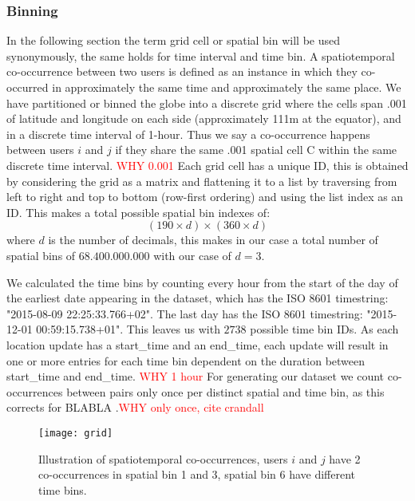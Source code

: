 \subsubsection{Binning} \label{ssec:binning}
In the following section the term grid cell or spatial bin will be used synonymously, the same holds for time interval and time bin.
A spatiotemporal co-occurrence between two users is defined as an instance in which they co-occurred in approximately the same time and approximately the same place.
We have partitioned or binned the globe into a discrete grid where the cells span .001{\degree} of latitude and longitude on each side (approximately 111m at the equator), and in a discrete time interval of 1-hour.
Thus we say a co-occurrence happens between users $i$ and $j$ if they share the same .001{\degree} spatial cell C within the same discrete time interval.
\textcolor{red}{WHY 0.001}
Each grid cell has a unique ID, this is obtained by considering the grid as a matrix and flattening it to a list by traversing from left to right and top to bottom (row-first ordering) and using the list index as an ID. This makes a total possible spatial bin indexes of: $$(190\times d)\times(360\times d)$$ where $d$ is the number of decimals, this makes in our case a total number of spatial bins of $68.400.000.000$ with our case of $d=3$.

We calculated the time bins by counting every hour from the start of the day of the earliest date appearing in the dataset, which has the ISO 8601 timestring: "2015-08-09 22:25:33.766+02". The last day has the ISO 8601 timestring: "2015-12-01 00:59:15.738+01". This leaves us with $2738$ possible time bin IDs. As each location update has a start\_time and an end\_time, each update will result in one or more entries for each time bin dependent on the duration between start\_time and end\_time. \textcolor{red}{WHY 1 hour}  For generating our dataset we count co-occurrences between pairs only once per distinct spatial and time bin, as this corrects for BLABLA \cite{crandall2010inferring}.\textcolor{red}{WHY only once, cite crandall}
\begin{figure}[H]
    \hspace*{-1.0cm}
    \centering
    \texttt{[image: grid]}
    \caption{Illustration of spatiotemporal co-occurrences, users $i$ and $j$ have 2 co-occurrences in spatial bin 1 and 3, spatial bin 6 have different time bins.}
    \label{fig:binning}
\end{figure}

